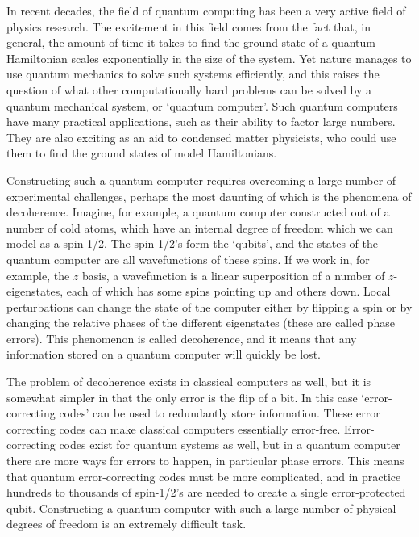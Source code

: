 In recent decades, the field of quantum computing has been a very active field of physics research. The excitement in this field comes from the fact that, in general, the amount of time it takes to find the ground state of a quantum Hamiltonian scales exponentially in the size of the system. Yet nature manages to use quantum mechanics to solve such systems efficiently, and this raises the question of what other computationally hard problems can be solved by a quantum mechanical system, or `quantum computer'. Such quantum computers have many practical applications, such as their ability to factor large numbers. They are also exciting as an aid to condensed matter physicists, who could use them to find the ground states of model Hamiltonians.

Constructing such a quantum computer requires overcoming a large number of experimental challenges, perhaps the most daunting of which is the phenomena of decoherence. Imagine, for example, a quantum computer constructed out of a number of cold atoms, which have an internal degree of freedom which we can model as a spin-1/2. The spin-1/2's form the `qubits', and the states of the quantum computer are all wavefunctions of these spins. If we work in, for example, the $z$ basis, a wavefunction is a linear superposition of a number of $z$-eigenstates, each of which has some spins pointing up and others down. Local perturbations can change the state of the computer either by flipping a spin or by changing the relative phases of the different eigenstates (these are called phase errors). This phenomenon is called decoherence, and it means that any information stored on a quantum computer will quickly be lost.

The problem of decoherence exists in classical computers as well, but it is somewhat simpler in that the only error is the flip of a bit. In this case `error-correcting codes' can be used to redundantly store information. These error correcting codes can make classical computers essentially error-free. Error-correcting codes exist for quantum systems as well, but in a quantum computer there are more ways for errors to happen, in particular phase errors. This means that quantum error-correcting codes must be more complicated, and in practice hundreds to thousands of spin-1/2's are needed to create a single error-protected qubit. Constructing a quantum computer with such a large number of physical degrees of freedom is an extremely difficult task.


